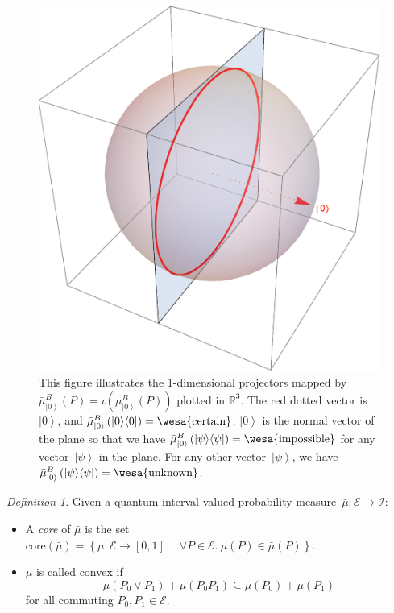 \documentclass[12pt]{iopart}
\theoremstyle{remark}
\newtheorem{definition}{Definition}
\newcommand{\events}{\ensuremath{\mathcal{E}}}
\newcommand{\pmeas}{\ensuremath{\mu}}
\newcommand{\imposs}{{\mbox{\wesa{impossible}}}}
\newcommand{\necess}{{\mbox{\wesa{certain}}}}
\newcommand{\unknown}{{\mbox{\wesa{unknown}}}}
\newcommand{\ket}[1]{{\left\vert{#1}\right\rangle}}
\newcommand{\op}[2]{\ensuremath{\left\vert{#1}\middle\rangle\middle\langle{#2}\right\vert}}
\newcommand{\proj}[1]{\op{#1}{#1}}
\newcommand{\set}[2]{\ensuremath{\left\{ {#1}~\middle|~{#2}\right\} }}
\begin{document}
\begin{figure}
\begin{centering}
\includegraphics[scale=0.38]{figure1} 
\par\end{centering}
\caption{\label{fig:three-dimensional-3-value}This figure illustrates the
1-dimensional projectors mapped by $\bar{\mu}_{\ket{0}}^{B}(P)=\iota\left(\mu_{\ket{0}}^{B}(P)\right)$
plotted in $\mathbb{R}^{3}$. The red dotted vector is $\ket{0}$,
and $\bar{\mu}_{\ket{0}}^{B}\left(\proj{0}\right)=\necess$. $\ket{0}$
is the normal vector of the plane so that we have $\bar{\mu}_{\ket{0}}^{B}\left(\proj{\psi}\right)=\imposs$
for any vector~$\ket{\psi}$ in the plane. For any other vector~$\ket{\psi}$,
we have $\bar{\mu}_{\ket{0}}^{B}\left(\proj{\psi}\right)=\unknown$.}
\end{figure}

\begin{definition} Given a quantum interval-valued probability measure~$\bar{\mu}:\events\rightarrow\mathscr{I}$: 
\begin{itemize}
\item A \emph{core} of $\bar{\mu}$ is the set $\mathrm{core}\left(\bar{\mu}\right)=\set{\pmeas:\events\rightarrow[0,1]}{\forall P\in\events.~\pmeas\left(P\right)\in\bar{\mu}\left(P\right)}$. 
\item $\bar{\mu}$ is called convex if 
\begin{equation}
\bar{\mu}\left(P_{0}\vee P_{1}\right)+\bar{\mu}\left(P_{0}P_{1}\right)\subseteq\bar{\mu}\left(P_{0}\right)+\bar{\mu}\left(P_{1}\right)\label{eq:QuantumInterval-valuedProbability-Convex}
\end{equation}
for all commuting $P_{0},P_{1}\in\events$. 
\end{itemize}
\end{definition}
\end{document}
